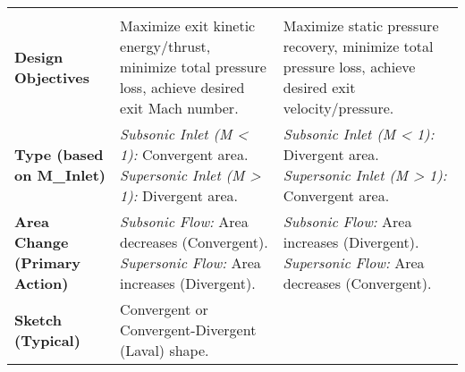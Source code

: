 \begin{longtable}[]{@{}lll@{}}
\begin{minipage}[t]{0.41\columnwidth}
\end{minipage}\tabularnewline
\begin{minipage}[t]{0.12\columnwidth}\raggedright
\textbf{Design Objectives}\strut
\end{minipage} & \begin{minipage}[t]{0.39\columnwidth}\raggedright
Maximize exit kinetic energy/thrust, minimize total pressure loss,
achieve desired exit Mach number.\strut
\end{minipage} & \begin{minipage}[t]{0.41\columnwidth}\raggedright
Maximize static pressure recovery, minimize total pressure loss, achieve
desired exit velocity/pressure.\strut
\end{minipage}\tabularnewline
\begin{minipage}[t]{0.12\columnwidth}\raggedright
\textbf{Type (based on M\_Inlet)}\strut
\end{minipage} & \begin{minipage}[t]{0.39\columnwidth}\raggedright
\emph{Subsonic Inlet (M \textless{} 1):} Convergent area.
\emph{Supersonic Inlet (M \textgreater{} 1):} Divergent area.\strut
\end{minipage} & \begin{minipage}[t]{0.41\columnwidth}\raggedright
\emph{Subsonic Inlet (M \textless{} 1):} Divergent area.
\emph{Supersonic Inlet (M \textgreater{} 1):} Convergent area.\strut
\end{minipage}\tabularnewline
\begin{minipage}[t]{0.12\columnwidth}\raggedright
\textbf{Area Change (Primary Action)}\strut
\end{minipage} & \begin{minipage}[t]{0.39\columnwidth}\raggedright
\emph{Subsonic Flow:} Area decreases (Convergent). \emph{Supersonic
Flow:} Area increases (Divergent).\strut
\end{minipage} & \begin{minipage}[t]{0.41\columnwidth}\raggedright
\emph{Subsonic Flow:} Area increases (Divergent). \emph{Supersonic
Flow:} Area decreases (Convergent).\strut
\end{minipage}\tabularnewline
\begin{minipage}[t]{0.12\columnwidth}\raggedright
\textbf{Sketch (Typical)}\strut
\end{minipage} & \begin{minipage}[t]{0.39\columnwidth}\raggedright
Convergent or Convergent-Divergent (Laval) shape.\strut
\end{minipage} & \begin{minipage}[t]{0.41\columnwidth}\raggedright

\end{minipage}
\end{longtable}
